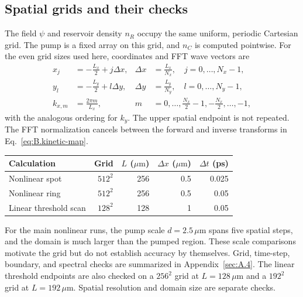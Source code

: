 \subsection{Spatial grids and their checks}\label{sec:B.4}
The field \(\psi\) and reservoir density \(n_R\) occupy the same uniform,
periodic Cartesian grid. The pump is a fixed array on this grid, and
\(n_C\) is computed pointwise. For the even grid sizes used here, coordinates and FFT wave vectors are
\begin{equation}
\begin{aligned}
x_j&=-\frac{L_x}{2}+j\Delta x,
&\Delta x&=\frac{L_x}{N_x},\quad j=0,\ldots,N_x-1,\\
y_l&=-\frac{L_y}{2}+l\Delta y,
&\Delta y&=\frac{L_y}{N_y},\quad l=0,\ldots,N_y-1,\\
k_{x,m}&=\frac{2\pi m}{L_x},
&m&=0,\ldots,\frac{N_x}{2}-1,-\frac{N_x}{2},\ldots,-1,
\end{aligned}\label{eq:B.grid}
\end{equation}
with the analogous ordering for \(k_y\). The upper spatial endpoint is
not repeated. The FFT normalization cancels between the forward and
inverse transforms in Eq.~\eqref{eq:B.kinetic-map}.

\begin{center}
\small\begin{tabular}{lrrrr}
\hline
Calculation & Grid & \(L\) (\(\mu\mathrm m\)) & \(\Delta x\) (\(\mu\mathrm m\)) & \(\Delta t\) (ps)\\
\hline
Nonlinear spot & \(512^2\) & 256 & 0.5 & 0.025\\
Nonlinear ring & \(512^2\) & 256 & 0.5 & 0.05\\
Linear threshold scan & \(128^2\) & 128 & 1 & 0.05\\
\hline
\end{tabular}
\end{center}
For the main nonlinear runs, the pump scale \(d=2.5\,\mu\mathrm m\)
spans five spatial steps, and the domain is much larger than the pumped
region. These scale comparisons motivate the grid but do not establish
accuracy by themselves. Grid, time-step, boundary, and spectral checks
are summarized in Appendix~\ref{sec:A.4}. The linear threshold endpoints are also
checked on a \(256^2\) grid at \(L=128\,\mu\mathrm m\) and a
\(192^2\) grid at \(L=192\,\mu\mathrm m\). Spatial resolution and
domain size are separate checks.
